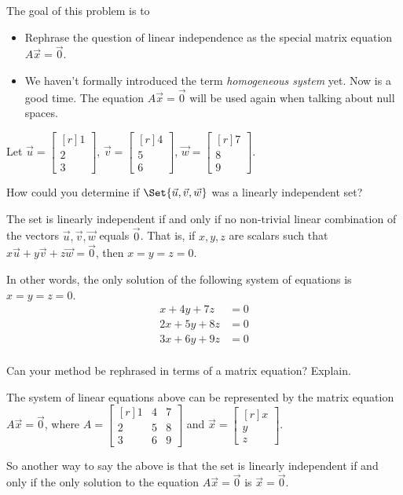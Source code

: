 \documentclass{problemset}
\newcommand{\mat}[1]{\begin{bmatrix*}[r]#1\end{bmatrix*}}
\begin{document}
	\question
	\begin{annotation}
		\begin{goals}

			The goal of this problem is to
			\begin{itemize}
				\item Rephrase the question of linear independence as the special
					matrix equation $A\vec x=\vec 0$.
			\end{itemize}
		\end{goals}

		\begin{notes}
			\begin{itemize}
				\item We haven't formally introduced the term \emph{homogeneous system}
					yet. Now is a good time. The equation $A\vec x=\vec 0$ will be used
					again when talking about null spaces.
			\end{itemize}
		\end{notes}
	\end{annotation}
	Let $\vec u=\mat{1\\2\\3}$, $\vec v=\mat{4\\5\\6}$, $\vec w=\mat{7\\8\\9}$.
	\begin{parts}
		\item How could you determine if $\Set{\vec u,\vec v,\vec w}$ was a linearly
			independent set?
			\begin{solution}
				The set is linearly independent if and only if no non-trivial linear
				combination of the vectors $\vec u,\vec v,\vec w$ equals $\vec 0$.
				That is, if $x, y, z$ are scalars such that
				$x\vec u+y\vec v+z\vec w=\vec 0$, then $x=y=z=0$.

				In other words, the only solution of the following
				system of equations is $x=y=z=0$.
				\begin{align*}
					x + 4y + 7z &= 0 \\
					2x + 5y + 8z &= 0 \\
					3x + 6y + 9z &= 0 \\
				\end{align*}
			\end{solution}
		\item Can your method be rephrased in terms of a matrix equation? Explain.
			\begin{solution}
				The system of linear equations above can be represented by the
				matrix equation $A\vec x = \vec 0$, where $A = \mat{1&4&7\\2&5&8\\3&6&9}$
				and $\vec x=\mat{x\\y\\z}$.

				So another way to say the above is that the set is linearly independent
				if and only if the only solution to the equation $A \vec x = \vec 0$
				is $\vec x = \vec 0$.
			\end{solution}
	\end{parts}
\end{document}
